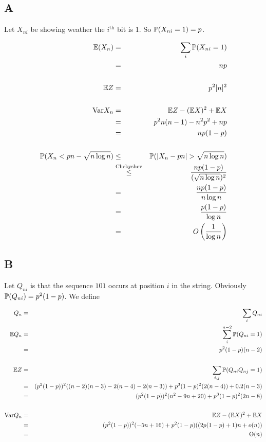 \documentclass[a4paper]{article}
\begin{document}
\subsection{A}

Let $ X_{ni} $ be \irv showing weather the $ i^{\mathrm{th}} $ bit is 1. So $ \P(X_{ni} = 1) = p $.

\begin{eqnarray*}
  \E(X_n) &=& \sum_i \P(X_{ni} = 1) \\
  &=& np \\
  \\
  \E Z &=& p^2[n]^2 \\
  \\
  \Var X_n &=& \E Z - (\E X)^2 + \E X \\
           &=& p^2n(n-1) - n^2p^2 + np \\
           &=& np(1 - p) \\
  \\
  \P(X_n < pn - \sqrt{n\log n}) &\le& \P(|X_n - pn| > \sqrt{n\log n}) \\
    &\overset{\mathrm{Chebyshev}}{\le}& \frac{np(1-p)}{(\sqrt{n\log n})^2} \\
    &=& \frac{np(1-p)}{n\log n} \\
    &=& \frac{p(1-p)}{\log n} \\
    &=& O\B{\frac{1}{\log n}} \\
\end{eqnarray*}

\subsection{B}

Let $ Q_{ni} $ is \irv that the sequence $ 101 $ occurs at position $ i $ in the string. Obviously $ \P(Q_{ni}) = p^2(1-p) $. We define

\begin{eqnarray*}
  Q_n &=& \sum_i Q_{ni} \\
  \E Q_n &=& \sum_i^{n-2} \P(Q_{ni} = 1) \\ 
    &=& p^2(1-p)(n-2) \\
  \\
  \E Z &=& \sum_{i,j} \P(Q_{ni}Q_{nj} = 1) \\
     &=& (p^2(1-p))^2 ((n-2)(n-3) - 2(n-4) - 2(n-3)) + p^3(1-p)^2 (2(n-4)) + 0.2(n-3) \\
     &=& (p^2(1-p))^2(n^2 - 9n + 20) + p^3(1-p)^2(2n - 8) \\
  \\
  \Var Q_n &=& \E Z - (\E X)^2 + \E X \\
    &=& (p^2(1-p))^2(-5n + 16) + p^2(1-p)((2p(1-p) + 1)n + o(n)) \\
    &=& \Theta(n)
\end{eqnarray*}
\end{document}
